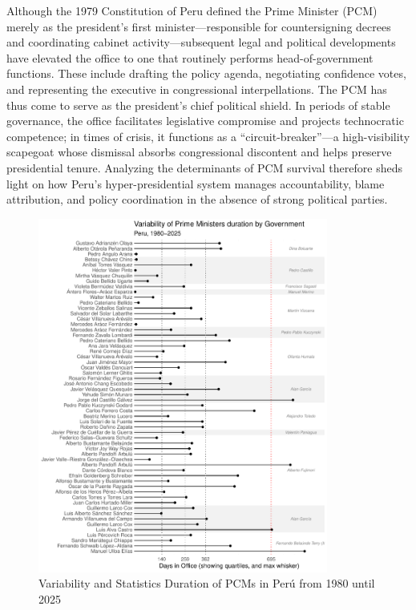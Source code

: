\documentclass[a4paper, 12pt]{article}
\begin{document}
Although the 1979 Constitution of Peru defined the Prime Minister (PCM) merely as the president’s first minister—responsible for countersigning decrees and coordinating cabinet activity—subsequent legal and political developments have elevated the office to one that routinely performs head-of-government functions. These include drafting the policy agenda, negotiating confidence votes, and representing the executive in congressional interpellations. The PCM has thus come to serve as the president’s chief political shield. In periods of stable governance, the office facilitates legislative compromise and projects technocratic competence; in times of crisis, it functions as a “circuit-breaker”—a high-visibility scapegoat whose dismissal absorbs congressional discontent and helps preserve presidential tenure. Analyzing the determinants of PCM survival therefore sheds light on how Peru’s hyper-presidential system manages accountability, blame attribution, and policy coordination in the absence of strong political parties.
\begin{figure}[ht]
\centering
\includegraphics[width=0.85\textwidth]{durationLolli.pdf}
\caption{Variability and Statistics Duration of PCMs in Perú from 1980 until 2025}  
\label{durationLolli} 
\end{figure}
\end{document}
